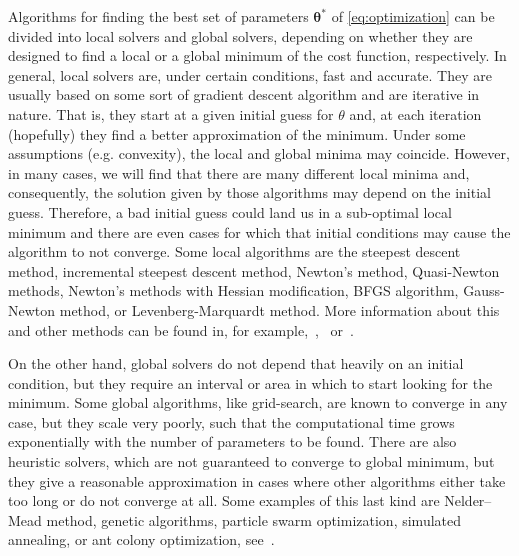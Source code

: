 Algorithms for finding the best set of parameters $\boldsymbol\theta^*$ of \eqref{eq:optimization} can be divided into local solvers and global solvers, depending on whether they are designed to find a local or a global minimum of the cost function, respectively. In general, local solvers are, under certain conditions, fast and accurate. They are usually based on some sort of gradient descent algorithm and are iterative in nature. That is, they start at a given initial guess for $\theta$ and, at each iteration (hopefully) they find a better approximation of the minimum. Under some assumptions (e.g. convexity), the local and global minima may coincide. However, in many cases, we will find that there are many different local minima and, consequently, the solution given by those algorithms may depend on the initial guess. Therefore, a bad initial guess could land us in a sub-optimal local minimum and there are even cases for which that initial conditions may cause the algorithm to not converge. Some local algorithms are the steepest descent method, incremental steepest descent method, Newton’s method, Quasi-Newton methods, Newton’s methods with Hessian modification, BFGS algorithm, Gauss-Newton method, or Levenberg-Marquardt method. More information about this and other methods can be found in, for example,~\citet{nocedal_numerical_optization},~\citet{arora_optimization_algorithms} or~\citet{rhinehart_nonlinear_regression_modeling}.


On the other hand, global solvers do not depend that heavily on an initial condition, but they require an interval or area in which to start looking for the minimum. Some global algorithms, like grid-search, are known to converge in any case, but they scale very poorly, such that the computational time grows exponentially with the number of parameters to be found. There are also heuristic solvers, which are not guaranteed to converge to global minimum, but they give a reasonable approximation in cases where other algorithms either take too long or do not converge at all. Some examples of this last kind are Nelder–Mead method, genetic algorithms, particle swarm optimization, simulated annealing, or ant colony optimization, see~\citet{arora_optimization_algorithms}.


